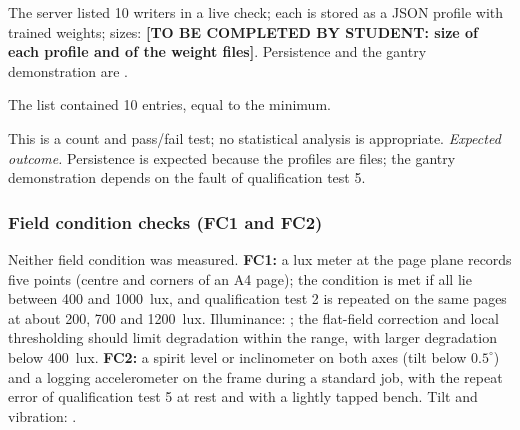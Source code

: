 
            The server listed 10 writers in a live check; each is stored as a JSON profile with trained weights; sizes: \textbf{[TO BE COMPLETED BY STUDENT: size of each profile and of the weight files]}.
            Persistence and the gantry demonstration are \nym{}.


            The list contained 10 entries, equal to the minimum.


            This is a count and pass/fail test; no statistical analysis is appropriate.
            \emph{Expected outcome.}
            Persistence is expected because the profiles are files; the gantry demonstration depends on the fault of qualification test 5.


\subsubsection*{Field condition checks (FC1 and FC2)}
\label{sec:res-fc}

Neither field condition was measured.
\textbf{FC1:} a lux meter at the page plane records five points (centre and corners of an A4 page); the condition is met if all lie between 400 and 1000~lux, and qualification test 2 is repeated on the same pages at about 200, 700 and 1200~lux.
Illuminance: \nym{}; the flat-field correction and local thresholding should limit degradation within the range, with larger degradation below 400~lux.
\textbf{FC2:} a spirit level or inclinometer on both axes (tilt below $0.5^\circ$) and a logging accelerometer on the frame during a standard job, with the repeat error of qualification test 5 at rest and with a lightly tapped bench.
Tilt and vibration: \nym{}.


